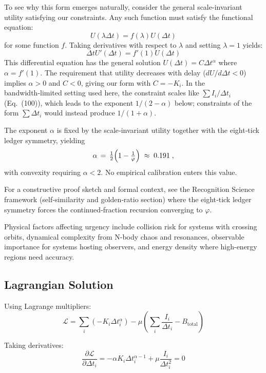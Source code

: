 \documentclass[twocolumn,prd,amsmath,amssymb,aps,superscriptaddress,nofootinbib]{revtex4-2}
\begin{document}
To see why this form emerges naturally, consider the general scale-invariant utility satisfying our constraints. Any such function must satisfy the functional equation:
\begin{equation}
U(\lambda \Delta t) = f(\lambda) U(\Delta t)
\end{equation}
for some function $f$. Taking derivatives with respect to $\lambda$ and setting $\lambda = 1$ yields:
\begin{equation}
\Delta t U'(\Delta t) = f'(1) U(\Delta t)
\end{equation}
This differential equation has the general solution $U(\Delta t) = C \Delta t^{\alpha}$ where $\alpha = f'(1)$. The requirement that utility decreases with delay ($dU/d\Delta t < 0$) implies $\alpha > 0$ and $C < 0$, giving our form with $C = -K_i$.
In the bandwidth‑limited setting used here, the constraint scales like $\sum I_i/\Delta t_i$ (Eq.~(100)), which leads to the exponent $1/(2-\alpha)$ below; constraints of the form $\sum \Delta t_i$ would instead produce $1/(1+\alpha)$.

The exponent $\alpha$ is fixed by the scale‑invariant utility together with the eight‑tick ledger symmetry, yielding
\[
  \alpha \,=\, \tfrac12\Bigl(1 - \tfrac{1}{\varphi}\Bigr)\;\approx\;0.191\;,
\]
with convexity requiring $\alpha<2$. No empirical calibration enters this value.

For a constructive proof sketch and formal context, see the Recognition Science framework (self‑similarity and golden‑ratio section) where the eight‑tick ledger symmetry forces the continued‑fraction recursion converging to $\varphi$.

Physical factors affecting urgency include collision risk for systems with crossing orbits, dynamical complexity from N-body chaos and resonances, observable importance for systems hosting observers, and energy density where high-energy regions need accuracy.

\subsection{Lagrangian Solution}

Using Lagrange multipliers:
\begin{equation}
\mathcal{L} = \sum_i (-K_i \Delta t_i^\alpha) - \mu\left(\sum_i \frac{I_i}{\Delta t_i} - B_{\text{total}}\right)
\end{equation}

Taking derivatives:
\begin{equation}
\frac{\partial \mathcal{L}}{\partial \Delta t_i} = -\alpha K_i \Delta t_i^{\alpha-1} + \mu \frac{I_i}{\Delta t_i^2} = 0
\end{equation}
\end{document}
